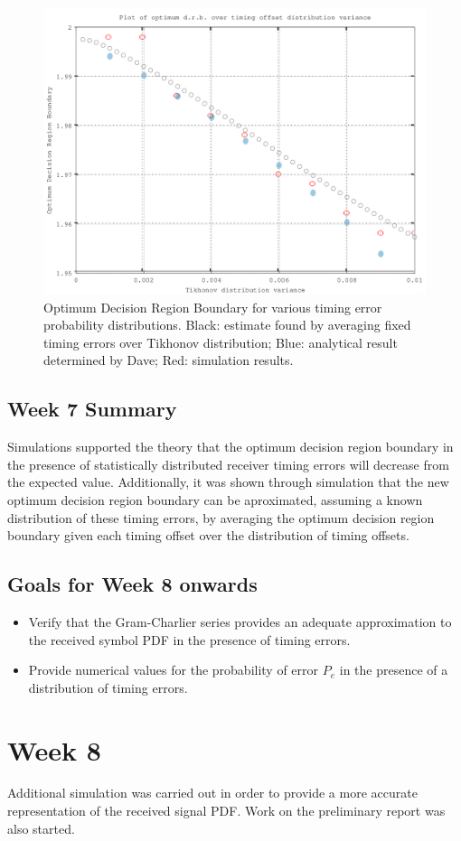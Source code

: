 \begin{figure}[htbp]
\centering
\includegraphics[width=\linewidth]{../../../plots/opt_dec_reg.png}
\caption{Optimum Decision Region Boundary for various timing error
probability distributions. Black: estimate found by averaging fixed timing errors over Tikhonov distribution; Blue: analytical result determined by Dave; Red: simulation results.}
\end{figure}

\subsection{Week 7 Summary}

Simulations supported the theory that the optimum decision region
boundary in the presence of statistically distributed receiver timing
errors will decrease from the expected value. Additionally, it was shown
through simulation that the new optimum decision region boundary can be
aproximated, assuming a known distribution of these timing errors, by
averaging the optimum decision region boundary given each timing offset
over the distribution of timing offsets.

\subsection{Goals for Week 8 onwards}

\begin{itemize}
\itemsep1pt\parskip0pt
\item
  Verify that the Gram-Charlier series provides an adequate
  approximation to the received symbol PDF in the presence of timing
  errors.
\item
  Provide numerical values for the probability of error $P_e$ in the
  presence of a distribution of timing errors.
\end{itemize}

\section{Week 8}

Additional simulation was carried out in order to provide a more accurate representation of the received signal PDF. Work on the preliminary report was also started.
